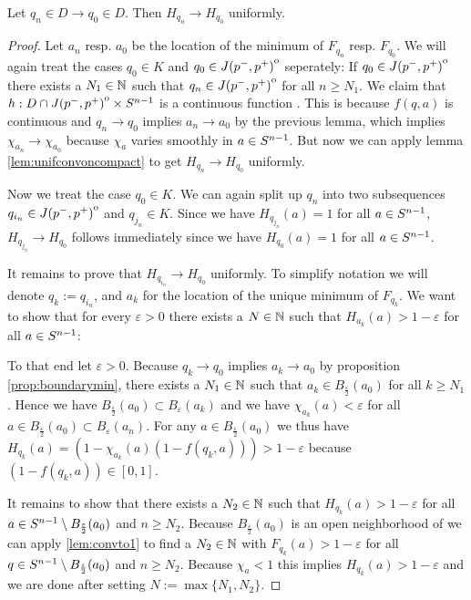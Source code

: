 \begin{proposition}\label{prop:hunif}
    Let $q_n\in D\to q_0\in D$. Then $H_{q_n}\to H_{q_0}$ uniformly.
\end{proposition}
\begin{proof}
    Let $a_n$ resp. $a_0$ be the location of the minimum of $F_{q_n}$ resp. $F_{q_0}$.
    We will again treat the cases $q_0\in K$ and $q_0\in {\kern0ptJ(p^-,p^+)}^{\mathrm{o}}$ seperately:
    If $q_0\in {\kern0ptJ(p^-,p^+)}^{\mathrm{o}}$ there exists a $N_1\in \mathbb{N}$ such that $q_n \in {\kern0ptJ(p^-,p^+)}^{\mathrm{o}}$ for all $n\ge N_1$. We claim that $h:D\cap {\kern0ptJ(p^-,p^+)}^{\mathrm{o}}\times {S^{n-1}}$ is a continuous function . This is because $f(q,a)$ is continuous and $q_n\to q_0$ implies $a_n\to a_0$ by the previous lemma, which implies $\chi_{a_n}\to \chi_{a_0}$ because $\chi_a$ varies smoothly in $a\in {S^{n-1}}$. But now we can apply lemma \ref{lem:unifconvoncompact} to get $H_{q_n}\to H_{q_0}$ uniformly.

    Now we treat the case $q_0\in K$. We can again split up $q_n$ into two subsequences $q_{i_n}\in {\kern0ptJ(p^-,p^+)}^{\mathrm{o}}$ and $q_{j_n}\in K$. Since we have $H_{q_{j_n}}(a)=1$ for all $a\in {S^{n-1}}$, $H_{q_{j_n}}\to H_{q_0}$ follows immediately since we have $H_{q_0}(a)=1$ for all $a\in {S^{n-1}}$.

    It remains to prove that $H_{q_{i_n}}\to H_{q_0}$ uniformly. To simplify notation we will denote $q_k:=q_{i_n}$, and $a_k$ for the location of the unique minimum of $F_{q_k}$. We want to show that for every $\varepsilon>0$ there exists a $N\in \mathbb{N}$ such that $H_{a_k}(a)>1-\varepsilon$ for all $a\in {S^{n-1}}$:

    To that end let $\varepsilon>0$. Because $q_k\to q_0$ implies $a_k\to a_0$ by proposition \ref{prop:boundarymin}, there exists a $N_1\in \mathbb{N}$ such that $a_k\in B_\frac{\varepsilon}{2}(a_0)$ for all $k\ge N_1$. Hence we have $B_\frac{\varepsilon}{2}(a_0)\subset B_\varepsilon(a_k)$ and we have $\chi_{a_k}(a)<\varepsilon$ for all $a\in B_\frac{\varepsilon}{2}(a_0)\subset B_\varepsilon(a_n)$.
    For any $a\in B_\frac{\varepsilon}{2}(a_0)$ we thus have $H_{q_k}(a) = (1-\chi_{a_k}(a)(1-f(q_k,a))) > 1-\varepsilon$ because $(1-f(q_k,a))\in [0,1]$.

    It remains to show that there exists a $N_2\in \mathbb{N}$ such that $H_{q_k}(a) > 1-\varepsilon$ for all $a\in {S^{n-1}}\setminus B_\frac{\varepsilon}{2}(a_0)$ and $n\ge N_2$. Because $B_\frac{\varepsilon}{2}(a_0)$ is an open neighborhood of we can apply \ref{lem:convto1} to find a $N_2\in \mathbb{N}$ with $F_{q_k}(a) > 1-\varepsilon$ for all $q\in {S^{n-1}} \setminus B_\frac{\varepsilon}{2}(a_0)$ and $n \ge N_2$. Because $\chi_{a}<1$ this implies $H_{q_k}(a) > 1-\varepsilon$ and we are done after setting $N:= \max \{N_1,N_2\}$.
\end{proof}

